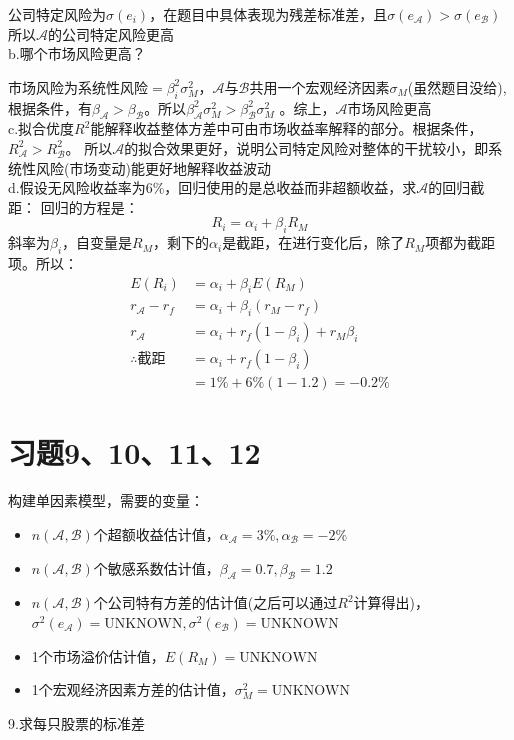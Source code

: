 \documentclass{article}
\begin{document}
公司特定风险为$\sigma(e_i)$，在题目中具体表现为残差标准差，且$\sigma(e_\mathcal{A} )>\sigma(e_\mathcal{B} )$
所以$\mathcal{A} $的公司特定风险更高\\

b.哪个市场风险更高？

市场风险为系统性风险$=\beta_i^2\sigma_M^2$，$\mathcal{A} $与$\mathcal{B} $共用一个宏观经济因素$\sigma_M$(虽然题目没给),
根据条件，有$\beta_\mathcal{A} >\beta_\mathcal{B} $。所以$\beta_\mathcal{A} ^2\sigma_M^2>\beta_\mathcal{B} ^2\sigma_M^2$
。综上，$\mathcal{A} $市场风险更高\\

c.拟合优度$R^2$能解释收益整体方差中可由市场收益率解释的部分。根据条件，$R_\mathcal{A} ^2>R_\mathcal{B} ^2$。
所以$\mathcal{A} $的拟合效果更好，说明公司特定风险对整体的干扰较小，即系统性风险(市场变动)能更好地解释收益波动\\

d.假设无风险收益率为6\%，回归使用的是总收益而非超额收益，求$\mathcal{A} $的回归截距：
回归的方程是：
\[R_i=\alpha_i+\beta_iR_M\]
斜率为$\beta_i$，自变量是$R_M$，剩下的$\alpha_i$是截距，在进行变化后，除了$R_M$项都为截距项。所以：
\begin{align}
    E(R_i)&=\alpha_i+\beta_iE(R_M)\\
    r_\mathcal{A}-r_f&=\alpha_i+\beta_i(r_M-r_f)\\
    r_\mathcal{A}& =\alpha_i+r_f(1-\beta_i)+r_M\beta_i\\
  \therefore \text{截距}&=\alpha_i+r_f(1-\beta_i)\\
  &=1\%+6\%(1-1.2)=-0.2\%
\end{align}
\clearpage

\section*{习题9、10、11、12}
\begin{spacing}{0.9}
    构建单因素模型，需要的变量：
    \begin{itemize}
        \item $n(\mathcal{A} ,\mathcal{B} )$个超额收益估计值，$\alpha_\mathcal{A}=3\% ,\alpha_\mathcal{B}=-2\%$
        \item $n(\mathcal{A} ,\mathcal{B} )$个敏感系数估计值，$\beta_\mathcal{A}=0.7,\beta_\mathcal{B}=1.2$
        \item $n(\mathcal{A} ,\mathcal{B} )$个公司特有方差的估计值(之后可以通过$R^2$计算得出)，$\sigma^2(e_\mathcal{A} )=\text{UNKNOWN},\sigma^2(e_\mathcal{B} )=\text{UNKNOWN}$
        \item 1个市场溢价估计值，$E(R_M)=\text{UNKNOWN}$
        \item 1个宏观经济因素方差的估计值，$\sigma_M^2=\text{UNKNOWN}$
    \end{itemize}
\end{spacing}
9.求每只股票的标准差
\end{document}
